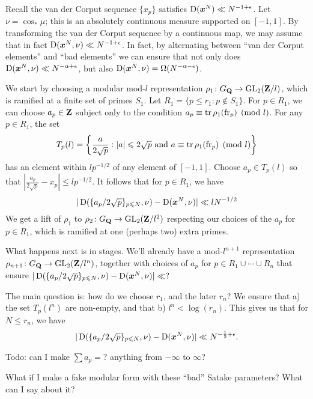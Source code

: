 Recall the van der Corput sequence $\{x_p\}$ satisfies 
$\operatorname{D}({\boldsymbol x}^N) \ll N^{-1+\epsilon}$. Let $\nu = \cos_\ast \mu$; this is an 
absolutely continuous measure supported on $[-1,1]$. By transforming the 
van der Corput sequence by a continuous map, we may assume that in fact 
$\operatorname{D}({\boldsymbol x}^N,\nu) \ll N^{-1+\epsilon}$. In fact, by alternating between 
``van der Corput elements'' and ``bad elements'' we can ensure that not 
only does $\operatorname{D}({\boldsymbol x}^N,\nu) \ll N^{-\alpha+\epsilon}$, but also 
$\operatorname{D}({\boldsymbol x}^N,\nu) = \Omega(N^{-\alpha-\epsilon})$. 

We start by choosing a modular mod-$l$ representation 
$\rho_1\colon G_{\mathbf{Q}} \to \operatorname{GL}_2(\mathbf{Z}/l)$, which is ramified at a finite set of 
primes $S_1$. Let $R_1 = \{p\leqslant r_1 : p \notin S_1\}$. For $p\in R_1$, 
we can choose $a_p\in \mathbf{Z}$ subject only to the condition 
$a_p \equiv \operatorname{tr} \rho_1(\mathrm{fr}_p)\pmod l$. For any $p\in R_1$, the set 
\[
	T_p(l) = \left\{\frac{a}{2\sqrt p} : |a| \leqslant 2\sqrt p\text{ and }a\equiv \operatorname{tr} \rho_1(\mathrm{fr}_p)\pmod l\right\}
\]
has an element within $l p^{-1/2}$ of any element of $[-1,1]$. Choose 
$a_p\in T_p(l)$ so that 
$\left|\frac{a_p}{2\sqrt p} - x_p\right| \leqslant l p^{-1/2}$. It follows 
that for $p\in R_1$, we have 
\[
	|\operatorname{D}(\{a_p/2\sqrt p\}_{p\leqslant N}, \nu) - \operatorname{D}({\boldsymbol x}^N,\nu)| \ll l N^{-1/2}
\]
We get a lift of $\rho_1$ to $\rho_2\colon G_{\mathbf{Q}} \to \operatorname{GL}_2(\mathbf{Z}/l^2)$ respecting 
our choices of the $a_p$ for $p\in R_1$, which is ramified at one (perhaps two) 
extra primes. 


What happens next is in stages. We'll already have a mod-$l^{n+1}$ 
representation $\rho_{n+1}\colon G_{\mathbf{Q}} \to \operatorname{GL}_2(\mathbf{Z}/l^n)$, together with 
choices of $a_p$ for $p\in R_1\cup \cdots \cup R_n$ that ensure 
$|\operatorname{D}(\{a_p / 2\sqrt p\}_{p\leqslant N}, \nu) - \operatorname{D}({\boldsymbol x}^N,\nu)| \ll ?$


The main question is: how do we choose $r_1$, and the later $r_n$? We ensure 
that a) the set $T_p(l^n)$ are non-empty, and that b) $l^n < \log(r_n)$. This 
gives us that for $N\leqslant r_n$, we have 
\[
	|\operatorname{D}(\{a_p / 2\sqrt p\}_{p\leqslant N}, \nu) - \operatorname{D}({\boldsymbol x}^N,\nu)| \ll N^{-\frac 1 2+\epsilon} .
\]

Todo: can I make $\sum a_p = ?$ anything from $-\infty$ to $\infty$?

What if I make a fake modular form with these ``bad'' Satake parameters? What 
can I say about it?
